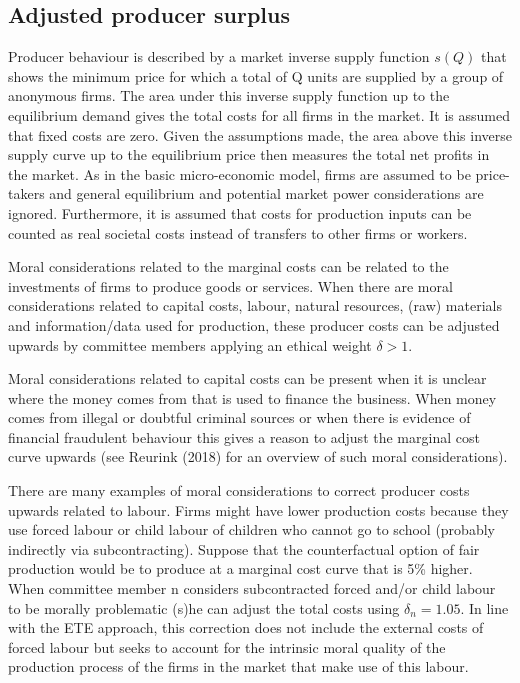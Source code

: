 \documentclass[
]{book}
\begin{document}
\hypertarget{adjusted-producer-surplus}{%
\subsection{Adjusted producer surplus}\label{adjusted-producer-surplus}}

Producer behaviour is described by a market inverse supply function \(s(Q)\) that shows the minimum price for which a total of Q units are supplied by a group of anonymous firms. The area under this inverse supply function up to the equilibrium demand gives the total costs for all firms in the market. It is assumed that fixed costs are zero. Given the assumptions made, the area above this inverse supply curve up to the equilibrium price then measures the total net profits in the market. As in the basic micro-economic model, firms are assumed to be price-takers and general equilibrium and potential market power considerations are ignored. Furthermore, it is assumed that costs for production inputs can be counted as real societal costs instead of transfers to other firms or workers.

Moral considerations related to the marginal costs can be related to the investments of firms to produce goods or services. When there are moral considerations related to capital costs, labour, natural resources, (raw) materials and information/data used for production, these producer costs can be adjusted upwards by committee members applying an ethical weight \(\delta > 1\).

Moral considerations related to capital costs can be present when it is unclear where the money comes from that is used to finance the business. When money comes from illegal or doubtful criminal sources or when there is evidence of financial fraudulent behaviour this gives a reason to adjust the marginal cost curve upwards (see Reurink (2018) for an overview of such moral considerations).

There are many examples of moral considerations to correct producer costs upwards related to labour. Firms might have lower production costs because they use forced labour or child labour of children who cannot go to school (probably indirectly via subcontracting). Suppose that the counterfactual option of fair production would be to produce at a marginal cost curve that is 5\% higher. When committee member n considers subcontracted forced and/or child labour to be morally problematic (s)he can adjust the total costs using \(\delta_n=1.05\). In line with the ETE approach, this correction does not include the external costs of forced labour but seeks to account for the intrinsic moral quality of the production process of the firms in the market that make use of this labour.
\end{document}
